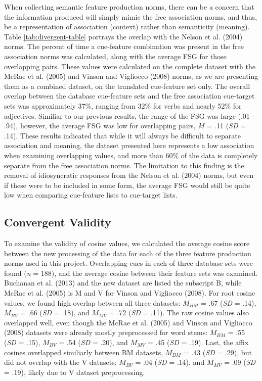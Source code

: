 \documentclass[english,man]{apa6}
\theoremstyle{definition}
\theoremstyle{definition}
\theoremstyle{definition}
\theoremstyle{remark}
\begin{document}
When collecting semantic feature production norms, there can be a
concern that the information produced will simply mimic the free
association norms, and thus, be a representation of association
(context) rather than semanticity (meaning). Table
\ref{tab:divergent-table} portrays the overlap with the Nelson et al.
(2004) norms. The percent of time a cue-feature combination was present
in the free association norms was calculated, along with the average FSG
for those overlapping pairs. These values were calculated on the
complete dataset with the McRae et al. (2005) and Vinson and Vigliocco
(2008) norms, as we are presenting them as a combined dataset, on the
translated cue-feature set only. The overall overlap between the
database cue-feature sets and the free association cue-target sets was
approximately 37\%, ranging from 32\% for verbs and nearly 52\% for
adjectives. Similiar to our previous results, the range of the FSG was
large (.01 - .94), however, the average FSG was low for overlapping
pairs, \emph{M} = .11 (\emph{SD} = .14). These results indicated that
while it will always be difficult to separate association and meaning,
the dataset presented here represents a low association when examining
overlapping values, and more than 60\% of the data is completely
separate from the free association norms. The limitation to this finding
is the removal of idiosyncratic responses from the Nelson et al. (2004)
norms, but even if these were to be included in some form, the average
FSG would still be quite low when comparing cue-feature lists to
cue-target lists.

\subsection{Convergent Validity}\label{convergent-validity}

To examine the validity of cosine values, we calculated the average
cosine score between the new processing of the data for each of the
three feature production norms used in this project. Overlapping cues in
each of three database sets were found (\emph{n} = 188), and the average
cosine between their feature sets was examined. Buchanan et al. (2013)
and the new dataset are listed the subscript B, while McRae et al.
(2005) is M and V for Vinson and Vigliocco (2008). For root cosine
values, we found high overlap between all three datasets: \(M_{BM}\) =
.67 (\emph{SD} = .14), \(M_{BV}\) = .66 (\emph{SD} = .18), and
\(M_{MV}\) = .72 (\emph{SD} = .11). The raw cosine values also
overlapped well, even though the McRae et al. (2005) and Vinson and
Vigliocco (2008) datasets were already mostly preprocessed for word
stems: \(M_{BM}\) = .55 (\emph{SD} = .15), \(M_{BV}\) = .54 (\emph{SD} =
.20), and \(M_{MV}\) = .45 (\emph{SD} = .19). Last, the affix cosines
overlapped similiarly between BM datasets, \(M_{BM}\) = .43 (\emph{SD} =
.29), but did not overlap with the V datasets: \(M_{BV}\) = .04
(\emph{SD} = .14), and \(M_{MV}\) = .09 (\emph{SD} = .19), likely due to
V dataset preprocessing.
\end{document}
